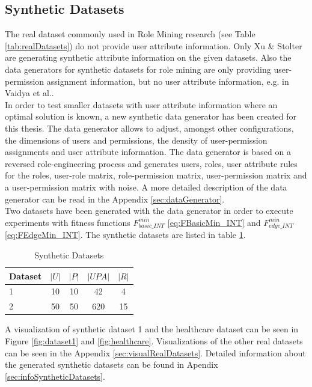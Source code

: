 \subsection{Synthetic Datasets}
The real dataset commonly used in Role Mining research (see Table \ref{tab:realDatasets}) do not provide user attribute information. Only Xu \& Stolter\cite{Xu} are generating synthetic attribute information on the given datasets. Also the data generators for synthetic datasets for role mining are only providing user-permission assignment information, but no user attribute information, e.g. in Vaidya et al.\cite{Vaidya:2006:RMR:1180405.1180424}.\\
In order to test smaller datasets with user attribute information where an optimal solution is known, a new synthetic data generator has been created for this thesis. The data generator allows to adjust, amongst other configurations, the dimensions of users and permissions, the density of user-permission assignments and user attribute information. The data generator is based on a reversed role-engineering process and generates users, roles, user attribute rules for the roles, user-role matrix, role-permission matrix, user-permission matrix and a user-permission matrix with noise. A more detailed description of the data generator can be read in the Appendix \ref{sec:dataGenerator}.\\
Two datasets have been generated with the data generator in order to execute experiments with fitness functions $F_{basic\_INT}^{min}$ \eqref{eq:FBasicMin_INT} and $F_{edge\_INT}^{min}$ \eqref{eq:FEdgeMin_INT}. The synthetic datasets are listed in table \ref{tab:syntheticDatasets}.
\begin{table}[H]
    \centering
    \begin{tabular}{|l|c|c|c|c|}
        \hline
        \rowcolor{myGray} 
        \textbf{Dataset} & \textbf{$|U|$} & \textbf{$|P|$} & \textbf{$|UPA|$} & \textbf{$|R|$}\\ \hline
        1       & 10    & 10   & 42    & 4\\ \hline
        2       & 50    & 50   & 620   & 15\\ \hline
    \end{tabular}
    \caption{Synthetic Datasets}
    \label{tab:syntheticDatasets}
\end{table}
A visualization of synthetic dataset 1 and the healthcare dataset can be seen in Figure \ref{fig:dataset1} and \ref{fig:healthcare}. Visualizations of the other real datasets can be seen in the Appendix \ref{sec:visualRealDatasets}. Detailed information about the generated synthetic datasets can be found in Apendix \ref{sec:infoSyntheticDatasets}.

